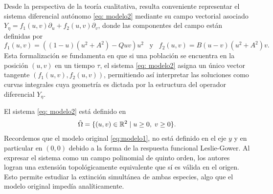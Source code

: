 \begin{remark}
	Desde la perspectiva de la teoría cualitativa, resulta conveniente representar el sistema diferencial autónomo \eqref{eq: modelo2} mediante su campo vectorial asociado $Y_{\eta} = f_1(u,v) \partial_u + f_2(u,v) \partial_v$, donde las componentes del campo están definidas por
	\begin{equation*}
		f_1(u, v) = ((1 - u)(u^{2} + A^{2}) - Q u v)u^{2} \; \; \; \text{y} \; \; \;
		f_2(u, v) = B(u - v)(u^{2} + A^{2})v.
	\end{equation*}
	Esta formalización se fundamenta en que si una población se encuentra en la posición $(u,v)$ en un tiempo $\tau$, el sistema \eqref{eq: modelo2} asigna un único vector tangente $(f_1(u, v), f_2(u, v))$, permitiendo así interpretar las soluciones como curvas integrales cuya geometría es dictada por la estructura del operador diferencial $Y_{\eta}$.
\end{remark}
\begin{remark}
    El sistema \eqref{eq: modelo2} está definido en $$\tilde{\Omega} = \{ (u, v) \in {\mathbb{R}}^{2} \; | \; u \geq 0, \; v \geq 0 \}.$$
    Recordemos que el modelo original \eqref{eq:modelo1}, no está definido en el eje $y$ y en particular en $(0,0)$ debido a la forma de la respuesta funcional Leslie-Gower. Al expresar el sistema como un campo polinomial de quinto orden, los autores logran una extensión topológicamente equivalente que sí es válida en el origen. Esto permite estudiar la extinción simultánea de ambas especies, algo que el modelo original impedía analíticamente. \\
\end{remark}
